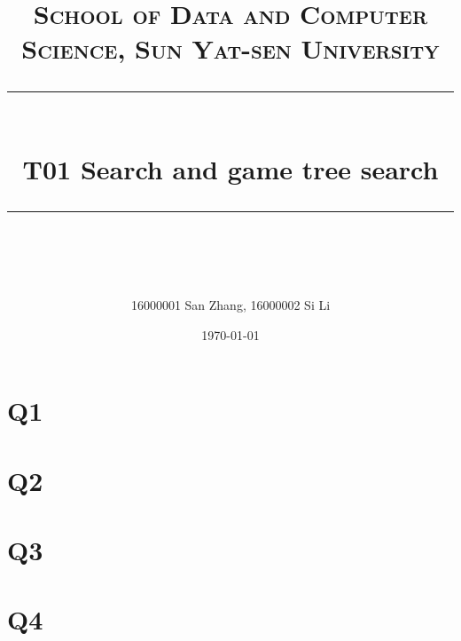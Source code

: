 ﻿\documentclass[a4paper, 11pt]{article}
\title{	
\normalfont \normalsize
\textsc{School of Data and Computer Science, Sun Yat-sen University} \\ [25pt] %
\rule{\textwidth}{0.5pt} \\[0.4cm] %
\huge  T01 Search and game tree search\\ %
\rule{\textwidth}{2pt} \\[0.5cm] %
\author{16000001 San Zhang, 16000002 Si Li}
\date{\normalsize\today}

}
\begin{document}
\maketitle
\tableofcontents
\newpage
\section{Q1}
\section{Q2}
\section{Q3}
\section{Q4}


%
%
\end{document}
